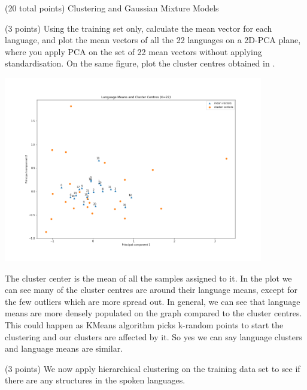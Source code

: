 \documentclass[12pt]{article}
\begin{document}
\begin{question}{(20 total points) Clustering and Gaussian Mixture Models}
\begin{subquestion}
\begin{answerbox}{35em}
      \end{answerbox}
  


   \end{subquestion}
   \begin{subquestion}{(3 points)
       Using the training set only,
       calculate the mean vector for each language, and plot the mean
       vectors of all the 22 languages on a 2D-PCA plane, where you
       apply PCA on the set of 22 mean vectors without applying
       standardisation.  
       On the same figure, plot the cluster centres obtained in .
     } \label{Q3.2}

   

      \begin{answerbox}{35em}
         \begin{center}
             \includegraphics[width=0.85\textwidth]{results/3_2.png}
         \end{center}
         The cluster center is the mean of all the samples assigned to it. In the plot we can see many of the cluster centres are around their language means, except for the few outliers which are more spread out. In general, we can see that language means are more densely populated on the graph compared to the cluster centres. This could happen as KMeans algorithm picks k-random points to start the clustering and our clusters are affected by it. So yes we can say language clusters and language means are similar. 
      \end{answerbox}
  


   \end{subquestion}
   \begin{subquestion}{(3 points)
       We now apply hierarchical clustering on the training data set
       to see if there are any structures in the spoken languages.
     } \label{Q3.3}



\end{subquestion}
\end{question}
\end{document}
